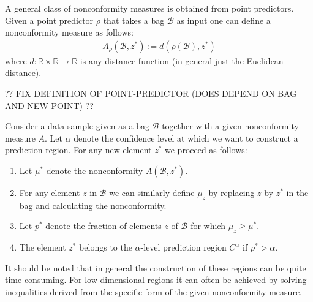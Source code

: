{    
    \begin{example}
        A general class of nonconformity measures is obtained from point predictors. Given a point predictor $\rho$ that takes a bag $\mathcal{B}$ as input one can define a nonconformity measure as follows:
        \begin{gather}
            A_\rho(\mathcal{B}, z^*) := d(\rho(\mathcal{B}), z^*)
        \end{gather}
        where $d:\mathbb{R}\times\mathbb{R}\rightarrow\mathbb{R}$ is any distance function (in general just the Euclidean distance).
    \end{example}

    ?? FIX DEFINITION OF POINT-PREDICTOR (DOES DEPEND ON BAG AND NEW POINT) ??

    \begin{construct}\label{data:cp}
        Consider a data sample given as a bag $\mathcal{B}$ together with a given nonconformity measure $A$. Let $\alpha$ denote the confidence level at which we want to construct a prediction region. For any new element $z^*$ we proceed as follows:
        \begin{enumerate}
            \item Let $\mu^*$ denote the nonconformity $A(\mathcal{B}, z^*)$.
            \item For any element $z$ in $\mathcal{B}$ we can similarly define $\mu_z$ by replacing $z$ by $z^*$ in the bag and calculating the nonconformity.
            \item Let $p^*$ denote the fraction of elements $z$ of $\mathcal{B}$ for which $\mu_z\geq\mu^*$.
            \item The element $z^*$ belongs to the $\alpha$-level prediction region $C^\alpha$ if $p^*>\alpha$.
        \end{enumerate}
        It should be noted that in general the construction of these regions can be quite time-consuming. For low-dimensional regions it can often be achieved by solving inequalities derived from the specific form of the given nonconformity measure.
    \end{construct}

}
